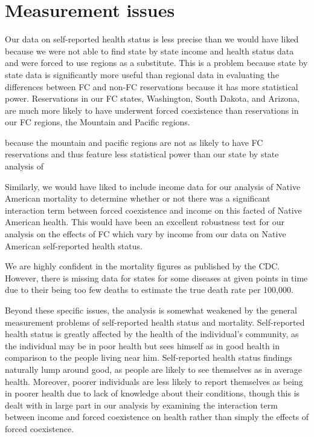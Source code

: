 \documentclass[12pt]{article}
\begin{document}
\section{Measurement issues}

Our data on self-reported health status is less precise than we would have liked because we were not able to find state by state income and health status data and were forced to use regions as a substitute.  This is a problem because state by state data is significantly more useful than regional data in evaluating the differences between FC and non-FC reservations because it has more statistical power.  Reservations in our FC states, Washington, South Dakota, and Arizona, are much more likely to have underwent forced coexistence than reservations in our FC regions, the Mountain and Pacific regions.

because the mountain and pacific regions are not as likely to have FC reservations and thus feature less statistical power than our state by state analysis of 

Similarly, we would have liked to include income data for our analysis of Native American mortality to  determine whether or not there was a significant interaction term between forced coexistence and income on this facted of Native American health.  This would have been an excellent robustness test for our analysis on the effects of FC which vary by income from our data on Native American self-reported health status.  

We are highly confident in the mortality figures as published by the CDC.  However, there is missing data for states for some diseases at given points in time due to their being too few deaths to estimate the true death rate per 100,000.

Beyond these specific issues, the analysis is somewhat weakened by the general measurement problems of self-reported health status and mortality.  Self-reported health status is greatly affected by the health of the individual's community, as the individual may be in poor health but sees himself as in good health in comparison to the people living near him.  Self-reported health status findings naturally lump around good, as people are likely to see themselves as in average health.  Moreover, poorer individuals are less likely to report themselves as being in poorer health due to lack of knowledge about their conditions, though this is dealt with in large part in our analysis by examining the interaction term between income and forced coexistence on health rather than simply the effects of forced coexistence.  
\end{document}

